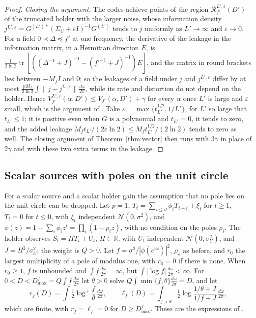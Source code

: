 \documentclass[11pt,onecolumn]{IEEEtran}
\newcommand{\R}{\mathbb{R}}
\newcommand{\tr}{\operatorname{tr}}
\newcommand{\dw}{\tfrac{d\omega}{2\pi}}
\begin{document}
\begin{proof}
\emph{Closing the argument.} The codes achieve points of the region
$\mathcal R^{L',\varepsilon}_{f'}(D')$ of the truncated holder with the
larger noise, whose information density
$j^{L',\varepsilon}=G^{(L')*}(\Sigma_U+\varepsilon I)^{-1}G^{(L')}$ tends to $j$
uniformly as $L'\to\infty$ and $\varepsilon\to0$. For a field
$0\prec\Delta\preceq f'$ at one frequency, the derivative of the leakage
in the information matrix, in a Hermitian direction $E$, is
$\tfrac1{2\ln2}\tr[((\Delta^{-1}+J)^{-1}-(f'^{-1}+J)^{-1})E]$, and the matrix
in round brackets lies between $-M_fI$ and $0$; so the leakages of a
field under $j$ and $j^{L',\varepsilon}$ differ by at most
$\tfrac{pM_f}{2\ln2}\int\|j-j^{L',\varepsilon}\|\dw$, while its rate and
distortion do not depend on the holder. Hence
$V^{L',\varepsilon}_{f'}(\alpha,D')\le V_{f'}(\alpha,D')+\gamma$ for every
$\alpha$ once $L'$ is large and $\varepsilon$ small, which is the argument
of \cite[proof of Theorem~22]{part2}. Take
$\varepsilon=\max\{t_{L'}^{1/2},1/L'\}$, for $L'$ so large that
$t_{L'}\le1$; it is positive even when $G$ is a polynomial and
$t_{L'}=0$, it tends to zero, and the added leakage
$M_ft_{L'}/(2\varepsilon\ln2)\le M_ft_{L'}^{1/2}/(2\ln2)$ tends to zero as well. The
closing argument of Theorem~\ref{thm:vector} then runs with $3\gamma$ in
place of $2\gamma$ and with these two extra terms in the leakage.
\end{proof}

\subsection{Scalar sources with poles on the unit circle}
\label{sec:circle}

For a scalar source and a scalar holder gain the assumption that no pole
lies on the unit circle can be dropped. Let $p=1$,
$T_t=\sum_{i\le d}\phi_iT_{t-i}+\xi_t$ for $t\ge1$, $T_t=0$ for $t\le0$, with
$\xi_t$ independent $\mathcal N(0,\sigma^2)$, and
$\phi(z)=1-\sum_i\phi_iz^i=\prod_i(1-\rho_iz)$, with no condition on the
poles $\rho_i$. The holder observes $S_t=HT_t+U_t$, $H\in\R$, with $U_t$
independent $\mathcal N(0,\sigma_U^2)$, and $J=H^2/\sigma_U^2$; the weight is
$Q>0$. Let $f=\sigma^2/|\phi(e^{i\omega})|^2$, $\rho_\star$ as before, and
$r_0$ the largest multiplicity of a pole of modulus one, with $r_0=0$ if
there is none. When $r_0\ge1$, $f$ is unbounded and $\int f\,\dw=\infty$,
but $\int|\log f|\,\dw<\infty$. For $0<D<D_{\max}^f=Q\int f\,\dw$ let
$\theta>0$ solve $Q\int\min\{f,\theta\}\dw=D$, and let
\[
r_f(D)=\int\tfrac12\log^+\frac f\theta\,\dw,\qquad
\ell_f(D)=\int_{f>\theta}\tfrac12\log\frac{1/\theta+J}{1/f+J}\,\dw,
\]
which are finite, with $r_f=\ell_f=0$ for $D\ge D_{\max}^f$. These are the
expressions of \cite[Corollary~27]{part3}.
\end{document}
